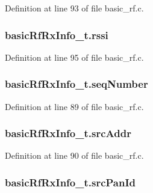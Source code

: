 Definition at line 93 of file basic\_\-rf.c.

\hypertarget{structbasic_rf_rx_info__t_a5a7f445193f8084cf2eb048f36c29d1c}{
\subsubsection[{rssi}]{ {\bf basicRfRxInfo\_\-t.rssi}}}
\label{structbasic_rf_rx_info__t_a5a7f445193f8084cf2eb048f36c29d1c}


Definition at line 95 of file basic\_\-rf.c.

\hypertarget{structbasic_rf_rx_info__t_aa5eb7ede96f7f00da24e7b6d4ebe1d0a}{
\subsubsection[{seqNumber}]{ {\bf basicRfRxInfo\_\-t.seqNumber}}}
\label{structbasic_rf_rx_info__t_aa5eb7ede96f7f00da24e7b6d4ebe1d0a}


Definition at line 89 of file basic\_\-rf.c.

\hypertarget{structbasic_rf_rx_info__t_a7cb2225fb2b4dfc645c5c234e609c0e4}{
\subsubsection[{srcAddr}]{ {\bf basicRfRxInfo\_\-t.srcAddr}}}
\label{structbasic_rf_rx_info__t_a7cb2225fb2b4dfc645c5c234e609c0e4}


Definition at line 90 of file basic\_\-rf.c.

\hypertarget{structbasic_rf_rx_info__t_a2ac3ff3aa5255df800d495bf23a131b6}{
\subsubsection[{srcPanId}]{ {\bf basicRfRxInfo\_\-t.srcPanId}}}
\label{structbasic_rf_rx_info__t_a2ac3ff3aa5255df800d495bf23a131b6}


